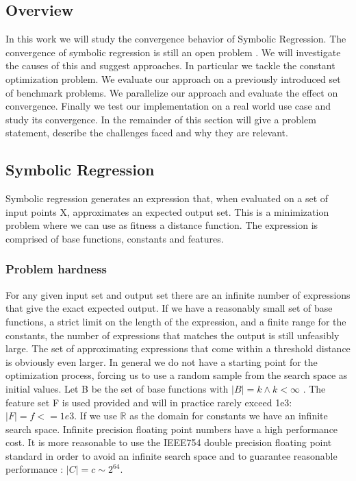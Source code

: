 \subsection{Overview}
In this work we will study the convergence behavior of Symbolic Regression. The convergence of symbolic regression is still an open problem \cite{SRBaseline, SRAccur, SRAccuracy, FFX}. We will investigate the causes of this and suggest approaches. In particular we tackle the constant optimization problem. We evaluate our approach on a previously introduced set of benchmark problems. We parallelize our approach and evaluate the effect on convergence. Finally we test our implementation on a real world use case and study its convergence.
In the remainder of this section will give a problem statement, describe the challenges faced and why they are relevant.

\subsection{Symbolic Regression}
Symbolic regression generates an expression that, when evaluated on a set of input points X, approximates an expected output set. This is a minimization problem where we can use as fitness a distance function. The expression is comprised of base functions, constants and features. 
\subsubsection{Problem hardness}
For any given input set and output set there are an infinite number of expressions that give the exact expected output. If we have a reasonably small set of base functions, a strict limit on the length of the expression, and a finite range for the constants, the number of expressions that matches the output is still unfeasibly large. The set of approximating expressions that come within a threshold distance is obviously even larger. In general we do not have a starting point for the optimization process, forcing us to use a random sample from the search space as initial values.
Let B be the set of base functions with $\vert B \vert = k \land k < \infty$ . The feature set F is used provided and will in practice rarely exceed 1e3: $\vert F \vert = f <= 1e3$. 
If we use $\mathbb{R}$ as the domain for constants we have an infinite search space. Infinite precision floating point numbers have a high performance cost. It is more reasonable to use the IEEE754  double precision floating point standard in order to avoid an infinite search space and to guarantee reasonable performance :  $\vert C \vert = c \sim 2^{64}$.
